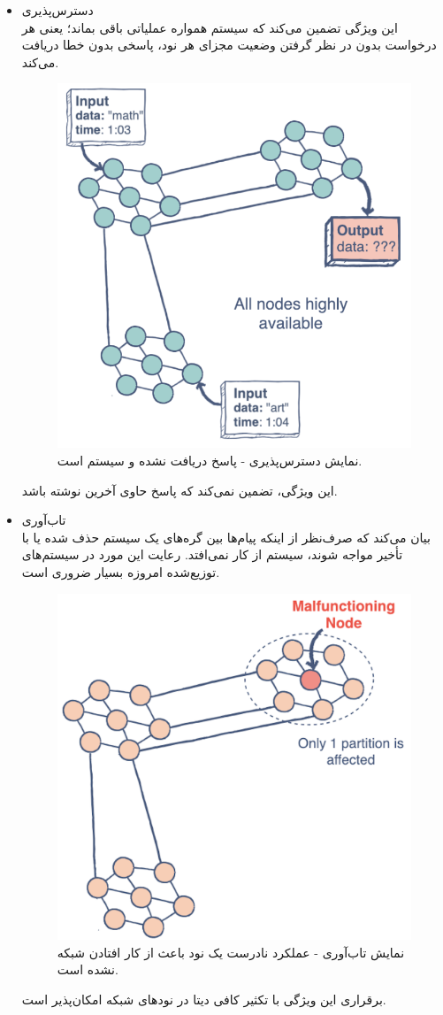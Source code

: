 \documentclass{article}
\begin{document}
\begin{multicols}{2}
\begin{itemize}
    \item دسترس‌پذیری
    \\
    این ویژگی تضمین می‌کند که سیستم همواره عملیاتی باقی بماند؛ یعنی هر درخواست بدون در نظر گرفتن وضعیت مجزای هر نود، پاسخی بدون خطا دریافت می‌کند.
    \begin{figure}[H]
        \centering
        \includegraphics[width=0.65\linewidth]{Photos/HW1/Availability.png}
        \caption{نمایش دسترس‌پذیری -
        پاسخ دریافت نشده و سیستم  است.}
        \label{fig:my_label}
    \end{figure}
    این ویژگی، تضمین نمی‌کند که پاسخ حاوی آخرین نوشته باشد.
    
    \item تاب‌آوری
    \\
    بیان می‌کند که صرف‌نظر از اینکه پیام‌ها بین گره‌های یک سیستم حذف شده یا با تأخیر مواجه شوند، سیستم از کار نمی‌افتد. رعایت این مورد در سیستم‌های توزیع‌شده امروزه بسیار ضروری است.
    \begin{figure}[H]
        \centering
        \includegraphics[width=0.6\linewidth]{Photos/HW1/Tolerance.png}
        \caption{نمایش تاب‌آوری -
        عملکرد نادرست یک نود باعث از کار افتادن شبکه نشده است.}
        \label{fig:my_label}
    \end{figure}
    برقراری این ویژگی با تکثیر کافی دیتا در نودهای شبکه امکان‌پذیر است.
    

\end{itemize}
\end{multicols}
\end{document}
